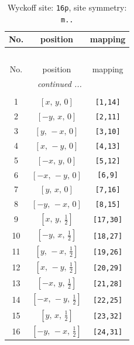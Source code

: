 \documentclass[fleqn,8pt]{jsarticle}
\begin{document}
\begin{longtable}{ccc}
\caption{Wyckoff site: {\tt 16p}, site symmetry: {\tt m..}}
 \\
 \hline \hline
No. & position & mapping \\ \hline \endfirsthead

\multicolumn{2}{l}{\tablename\ \thetable{}} \\
 \hline \hline
No. & position & mapping \\ \hline \endhead

 \hline \hline
\multicolumn{2}{r}{\footnotesize\it continued ...} \\ \endfoot

 \hline \hline
\multicolumn{2}{r}{} \\ \endlastfoot

1 & $\left[ x,\, y,\, 0 \right]$ & {\tt [1,14]} \\ \hline
2 & $\left[ - y,\, x,\, 0 \right]$ & {\tt [2,11]} \\ \hline
3 & $\left[ y,\, - x,\, 0 \right]$ & {\tt [3,10]} \\ \hline
4 & $\left[ x,\, - y,\, 0 \right]$ & {\tt [4,13]} \\ \hline
5 & $\left[ - x,\, y,\, 0 \right]$ & {\tt [5,12]} \\ \hline
6 & $\left[ - x,\, - y,\, 0 \right]$ & {\tt [6,9]} \\ \hline
7 & $\left[ y,\, x,\, 0 \right]$ & {\tt [7,16]} \\ \hline
8 & $\left[ - y,\, - x,\, 0 \right]$ & {\tt [8,15]} \\ \hline
9 & $\left[ x,\, y,\, \frac{1}{2} \right]$ & {\tt [17,30]} \\ \hline
10 & $\left[ - y,\, x,\, \frac{1}{2} \right]$ & {\tt [18,27]} \\ \hline
11 & $\left[ y,\, - x,\, \frac{1}{2} \right]$ & {\tt [19,26]} \\ \hline
12 & $\left[ x,\, - y,\, \frac{1}{2} \right]$ & {\tt [20,29]} \\ \hline
13 & $\left[ - x,\, y,\, \frac{1}{2} \right]$ & {\tt [21,28]} \\ \hline
14 & $\left[ - x,\, - y,\, \frac{1}{2} \right]$ & {\tt [22,25]} \\ \hline
15 & $\left[ y,\, x,\, \frac{1}{2} \right]$ & {\tt [23,32]} \\ \hline
16 & $\left[ - y,\, - x,\, \frac{1}{2} \right]$ & {\tt [24,31]} \\
\end{longtable}
\renewcommand{\arraystretch}{1.2}
\end{document}

